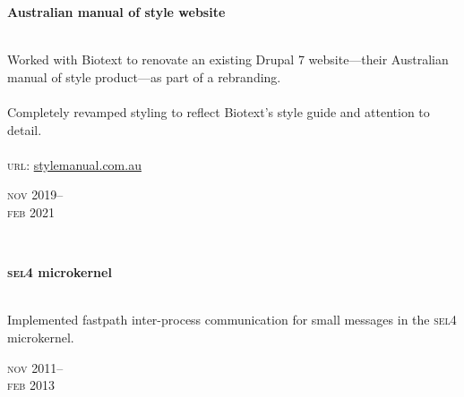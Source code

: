 \begin{minipage}[t]{\mainboxwidth\textwidth}
\textbf{Australian manual of style website}\\
{\small
\\
Worked with Biotext to renovate an existing Drupal 7 website—their Australian manual of style product—as part of a rebranding.\\
\\
Completely revamped styling to reflect Biotext's style guide and attention to detail.\\ 
\\
\textsc{url}: \href{https://stylemanual.com.au}{stylemanual.com.au} 
\par
}
\end{minipage}
\begin{minipage}[t]{\detailboxwidth\textwidth}
{
\hfill \textsc{nov} 2019--\\ 
\hspace*{0pt} \hfill \textsc{feb} 2021
\par
}
\end{minipage}
\\

\begin{minipage}[t]{\mainboxwidth\textwidth}
\textbf{\textsc{sel4} microkernel}\\
{\small
\\
Implemented fastpath inter-process communication for small messages in the \textsc{sel4} microkernel.\\
\par
}
\end{minipage}
\begin{minipage}[t]{\detailboxwidth\textwidth}
{
\hfill \textsc{nov} 2011--\\ 
\hspace*{0pt} \hfill \textsc{feb} 2013
\par
}
\end{minipage}


